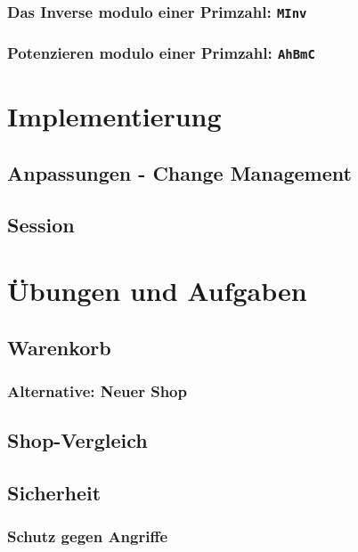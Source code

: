 \subsubsection*{Das Inverse modulo einer Primzahl: \texttt{MInv}}
\subsubsection*{Potenzieren modulo einer Primzahl: \texttt{AhBmC}}

\section{Implementierung}

\subsection{Anpassungen - Change Management}

\subsection{Session}

\section{Übungen und Aufgaben}

\subsection{Warenkorb}
\subsubsection*{Alternative: Neuer Shop}

\subsection{Shop-Vergleich}

\subsection{Sicherheit}
\subsubsection*{Schutz gegen Angriffe}
